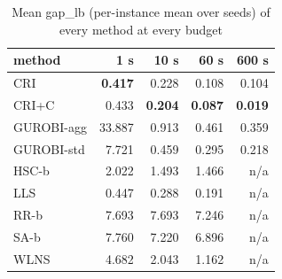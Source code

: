 \begin{table}[htbp]
\centering
\small
\caption{Mean gap\_lb (per-instance mean over seeds) of every method at every budget}
\label{tab:equal_budgets_1s_to_600s_gap_by_budget}
\begin{tabular}{lrrrr}
\toprule
method & 1 s & 10 s & 60 s & 600 s \\
\midrule
CRI & \textbf{0.417} & 0.228 & 0.108 & 0.104 \\
CRI+C & 0.433 & \textbf{0.204} & \textbf{0.087} & \textbf{0.019} \\
GUROBI-agg & 33.887 & 0.913 & 0.461 & 0.359 \\
GUROBI-std & 7.721 & 0.459 & 0.295 & 0.218 \\
HSC-b & 2.022 & 1.493 & 1.466 & n/a \\
LLS & 0.447 & 0.288 & 0.191 & n/a \\
RR-b & 7.693 & 7.693 & 7.246 & n/a \\
SA-b & 7.760 & 7.220 & 6.896 & n/a \\
WLNS & 4.682 & 2.043 & 1.162 & n/a \\
\bottomrule
\end{tabular}
\end{table}
